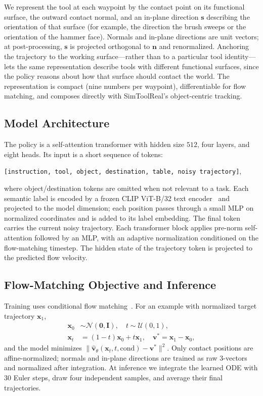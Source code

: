 \documentclass[11pt]{article}
\begin{document}
We represent the tool at each waypoint by the contact point on its functional surface, the outward contact normal, and an in-plane direction $\mathbf{s}$ describing the orientation of that surface (for example, the direction the brush sweeps or the orientation of the hammer face).
Normals and in-plane directions are unit vectors; at post-processing, $\mathbf{s}$ is projected orthogonal to $\mathbf{n}$ and renormalized.
Anchoring the trajectory to the working surface---rather than to a particular tool identity---lets the same representation describe tools with different functional surfaces, since the policy reasons about how that surface should contact the world.
The representation is compact (nine numbers per waypoint), differentiable for flow matching, and composes directly with SimToolReal's object-centric tracking.

\subsection{Model Architecture}
\label{sec:architecture}

The policy is a self-attention transformer with hidden size $512$, four layers, and eight heads.
Its input is a short sequence of tokens:
\begin{center}
\texttt{[instruction, tool, object, destination, table, noisy trajectory]},
\end{center}
where object/destination tokens are omitted when not relevant to a task.
Each semantic label is encoded by a frozen CLIP ViT-B/32 text encoder~\cite{clip} and projected to the model dimension; each position passes through a small MLP on normalized coordinates and is added to its label embedding.
The final token carries the current noisy trajectory.
Each transformer block applies pre-norm self-attention followed by an MLP, with an adaptive normalization conditioned on the flow-matching timestep.
The hidden state of the trajectory token is projected to the predicted flow velocity.

\subsection{Flow-Matching Objective and Inference}
\label{sec:flow}

Training uses conditional flow matching~\cite{flowmatching}.
For an example with normalized target trajectory $\mathbf{x}_1$,
\begin{align}
  \mathbf{x}_0 &\sim \mathcal{N}(\mathbf{0}, \mathbf{I}), \quad t \sim \mathcal{U}(0,1), \\
  \mathbf{x}_t &= (1-t)\mathbf{x}_0 + t\mathbf{x}_1, \quad \mathbf{v}^* = \mathbf{x}_1 - \mathbf{x}_0,
\end{align}
and the model minimizes $\|\hat{\mathbf{v}}_\theta(\mathbf{x}_t, t, \text{cond}) - \mathbf{v}^*\|^2$.
Only contact positions are affine-normalized; normals and in-plane directions are trained as raw 3-vectors and normalized after integration.
At inference we integrate the learned ODE with $30$ Euler steps, draw four independent samples, and average their final trajectories.
\end{document}
